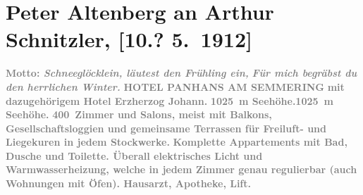 

               \section[Peter Altenberg an Arthur Schnitzler, {[}10.? 5. 1912{]}]{ Peter Altenberg an Arthur Schnitzler, {[}10.? 5. 1912{]}}\nopagebreak{}\rehead{ }\begin{ledgroupsized}[t]{13cm}\normalsize\beginnumbering{} \toendnotes[C]{\smallbreak\pagebreak[2]} 
\toendnotes[C]{\smallbreak}\pstart
           \noindent{}\raggedleft{}{\pb}\textcolor{gray}{\textbf{Motto: \emph{Schneeglöcklein, läutest den
                            Frühling ein,}}}\pend
           \pstart
           \noindent{}\raggedleft{}\textcolor{gray}{\textbf{\emph{Für mich begräbst du den herrlichen Winter.}}}\pend
           \pstart
           \noindent{}\centering{}\textcolor{gray}{\textbf{HOTEL PANHANS AM SEMMERING}}\pend
           \pstart
           \noindent{}\centering{}\textcolor{gray}{\textbf{mit dazugehörigem Hotel
                            Erzherzog Johann.}}\pend
           \pstart
           \noindent{}\textcolor{gray}{\textbf{1025 m Seehöhe.}}\hfill \textcolor{gray}{\textbf{1025 m Seehöhe.}}\pend
           \pstart
           \centering{}\textcolor{gray}{\textbf{400 Zimmer und Salons, meist mit Balkons,
                        Gesellschaftsloggien und gemeinsame Terrassen für Freiluft- und Liegekuren
                        in jedem Stockwerke.}}\pend
           \pstart
           \noindent{}\centering{}\textcolor{gray}{\textbf{Komplette Appartements mit Bad, Dusche und Toilette.
                        Überall elektrisches Licht und Warmwasserheizung, welche in jedem Zimmer
                        genau regulierbar (auch Wohnungen mit Öfen). Hausarzt, Apotheke, Lift.
}}
\end{ledgroupsized}
